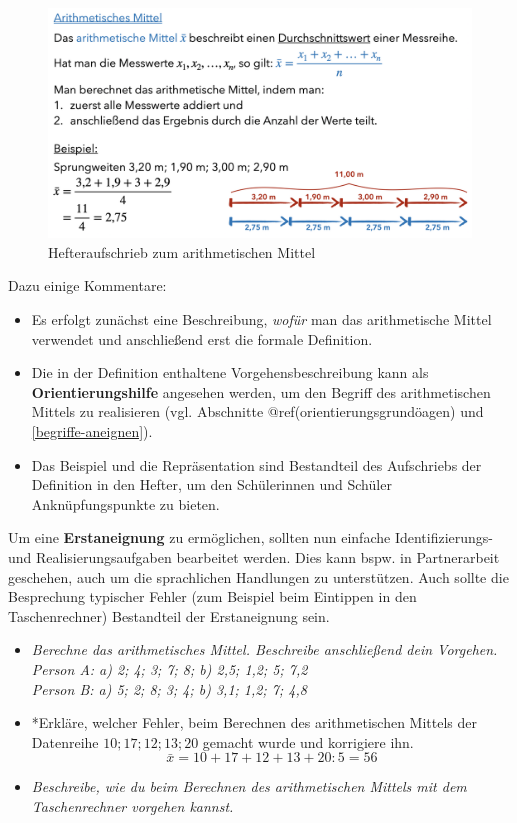 \documentclass[
]{scrbook}
\providecommand{\tightlist}{%
  \setlength{\itemsep}{0pt}\setlength{\parskip}{0pt}}
\theoremstyle{definition}
\theoremstyle{definition}
\theoremstyle{definition}
\theoremstyle{definition}
\theoremstyle{remark}
\begin{document}
\begin{figure}

{\centering \includegraphics[width=0.9\linewidth]{pictures/B-Hefter} 

}

\caption{Hefteraufschrieb zum arithmetischen Mittel}\label{fig:Hefter}
\end{figure}

Dazu einige Kommentare:

\begin{itemize}
\tightlist
\item
  Es erfolgt zunächst eine Beschreibung, \emph{wofür} man das arithmetische Mittel verwendet und anschließend erst die formale Definition.\\
\item
  Die in der Definition enthaltene Vorgehensbeschreibung kann als \textbf{Orientierungshilfe} angesehen werden, um den Begriff des arithmetischen Mittels zu realisieren (vgl. Abschnitte @ref(orientierungsgrundöagen) und \ref{begriffe-aneignen}).\\
\item
  Das Beispiel und die Repräsentation sind Bestandteil des Aufschriebs der Definition in den Hefter, um den Schülerinnen und Schüler Anknüpfungspunkte zu bieten.
\end{itemize}

Um eine \textbf{Erstaneignung} zu ermöglichen, sollten nun einfache Identifizierungs- und Realisierungsaufgaben bearbeitet werden. Dies kann bspw. in Partnerarbeit geschehen, auch um die sprachlichen Handlungen zu unterstützen. Auch sollte die Besprechung typischer Fehler (zum Beispiel beim Eintippen in den Taschenrechner) Bestandteil der Erstaneignung sein.

\begin{itemize}
\tightlist
\item
  \emph{Berechne das arithmetisches Mittel. Beschreibe anschließend dein Vorgehen.}\\
  \emph{Person A: a) 2; 4; 3; 7; 8; b) 2,5; 1,2; 5; 7,2}\\
  \emph{Person B: a) 5; 2; 8; 3; 4; b) 3,1; 1,2; 7; 4,8}
\item
  *Erkläre, welcher Fehler, beim Berechnen des arithmetischen Mittels der Datenreihe \(10; 17; 12; 13; 20\) gemacht wurde und korrigiere ihn.
  \[\bar{x} = 10+17+12+13+20:5 = 56\]
\item
  \emph{Beschreibe, wie du beim Berechnen des arithmetischen Mittels mit dem Taschenrechner vorgehen kannst.}
\end{itemize}
\end{document}
